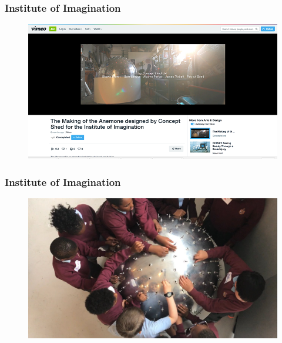 \begin{frame}
	\frametitle{Institute of Imagination}
	
	\begin{figure}
		 \href{https://vimeo.com/219518823}{\includegraphics[scale=.4]{assets/ioi}  }
	\end{figure}
	
\end{frame}

\begin{frame}
	\frametitle{Institute of Imagination}
	
	\begin{figure}
		\includegraphics[scale=.2]{assets/playing} 
	\end{figure}
	
\end{frame}




